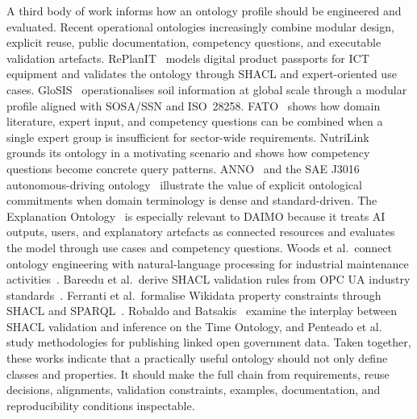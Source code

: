 \documentclass[Afour,sagev,times]{sagej}
\begin{document}
A third body of work informs how an ontology profile should be engineered and evaluated. Recent operational ontologies increasingly combine modular design, explicit reuse, public documentation, competency questions, and executable validation artefacts. RePlanIT~\cite{kurteva} models digital product passports for ICT equipment and validates the ontology through SHACL and expert-oriented use cases. GloSIS~\cite{palma} operationalises soil information at global scale through a modular profile aligned with SOSA/SSN and ISO~28258. FATO~\cite{fato} shows how domain literature, expert input, and competency questions can be combined when a single expert group is insufficient for sector-wide requirements. NutriLink~\cite{nutrilink} grounds its ontology in a motivating scenario and shows how competency questions become concrete query patterns. ANNO~\cite{anno} and the SAE J3016 autonomous-driving ontology~\cite{sae-onto} illustrate the value of explicit ontological commitments when domain terminology is dense and standard-driven. The Explanation Ontology~\cite{explanation-ontology} is especially relevant to DAIMO because it treats AI outputs, users, and explanatory artefacts as connected resources and evaluates the model through use cases and competency questions. Woods et al.\ connect ontology engineering with natural-language processing for industrial maintenance activities~\cite{woods}. Bareedu et al.\ derive SHACL validation rules from OPC UA industry standards~\cite{bareedu24}. Ferranti et al.\ formalise Wikidata property constraints through SHACL and SPARQL~\cite{ferranti}. Robaldo and Batsakis~\cite{robaldo} examine the interplay between SHACL validation and inference on the Time Ontology, and Penteado et al.~\cite{penteado23} study methodologies for publishing linked open government data. Taken together, these works indicate that a practically useful ontology should not only define classes and properties. It should make the full chain from requirements, reuse decisions, alignments, validation constraints, examples, documentation, and reproducibility conditions inspectable.
\end{document}
